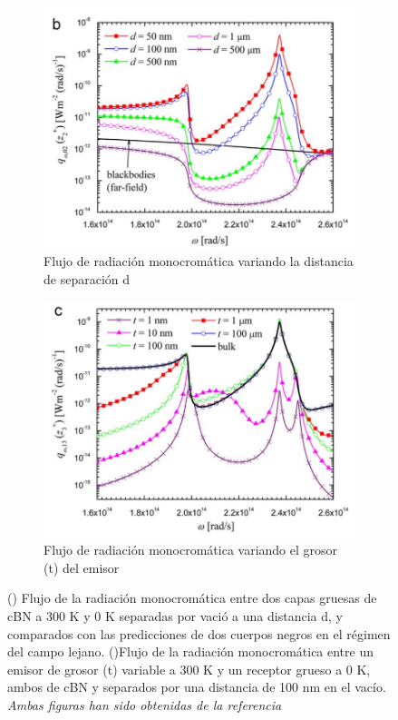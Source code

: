 \begin{figure}[H]
\centering
\begin{subfigure}[b]{0.48\textwidth}
	\centering
		\includegraphics[width=\textwidth]{figuras/graficaDiff_dc_fullEqu.png}
		\caption{Flujo de radiación monocromática variando la distancia de separación d}
	\label{fig:graficaDiff_dc_fullEqu}
\end{subfigure}
\begin{subfigure}[b]{0.48\textwidth}
	\centering
		\includegraphics[width=\textwidth]{figuras/graficaDiff_t_fullEqu.png}
		\caption{Flujo de radiación monocromática variando el grosor (t) del emisor}
	\label{fig:graficaDiff_t_fullEqu}
\end{subfigure}
\caption[Flujos de radiación monocromática por variación de grosor de emisor y variación de distancia]{() Flujo de la radiación monocromática entre dos capas gruesas de cBN a 300 K y 0 K separadas por vació a una distancia d, y comparados con las predicciones de dos cuerpos negros en el régimen del campo lejano. ()Flujo de la radiación monocromática entre un emisor de grosor (t) variable a 300 K y un receptor grueso a 0 K, ambos de cBN y separados por una distancia de 100 nm en el vacío. \textit{Ambas figuras han sido obtenidas de la referencia \cite{nfTPV_fullEquations}}}%
\label{fig:graficas_fullEqu}%
\end{figure}

